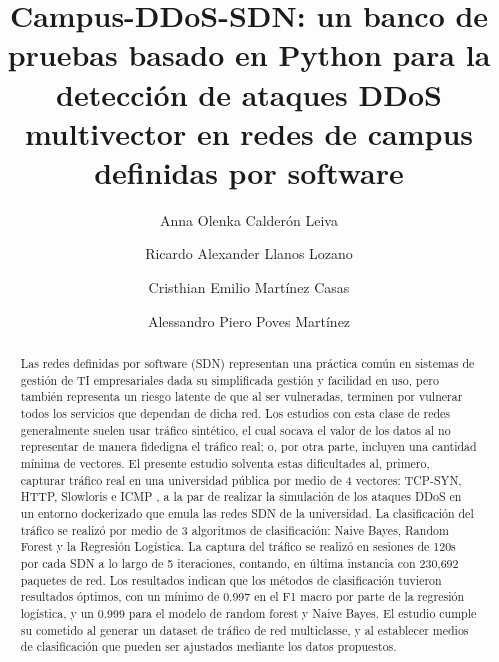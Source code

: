 \documentclass[a4paper,fleqn]{cas-dc}
\begin{document}
\let\WriteBookmarks\relax


\title[mode=title]{Campus-DDoS-SDN: un banco de pruebas basado en Python para la detección de ataques DDoS multivector en redes de campus definidas por software}

\author[1]{Anna Olenka Calderón Leiva}

\author[1]{Ricardo Alexander Llanos Lozano}

\author[1]{Cristhian Emilio Martínez Casas}
\cormark[1]

\author[1]{Alessandro Piero Poves Martínez}




\begin{abstract}
Las redes definidas por software (SDN) representan una práctica común en sistemas de gestión de TI empresariales dada su simplificada gestión y facilidad en uso, pero también representa un riesgo latente de que al ser vulneradas, terminen por vulnerar todos los servicios que dependan de dicha red. Los estudios con esta clase de redes generalmente suelen usar tráfico sintético, el cual socava el valor de los datos al no representar de manera fidedigna el tráfico real; o, por otra parte, incluyen una cantidad mínima de vectores. El presente estudio solventa estas dificultades al, primero, capturar tráfico real en una universidad pública por medio de 4 vectores: TCP-SYN, HTTP, Slowloris e ICMP , a la par de realizar la simulación de los ataques DDoS en un entorno dockerizado que emula las redes SDN de la universidad. La clasificación del tráfico se realizó por medio de 3 algoritmos de clasificación: Naive Bayes, Random Forest y la Regresión Logística. La captura del tráfico se realizó en sesiones de 120s por cada SDN a lo largo de 5 iteraciones, contando, en última instancia con 230,692 paquetes de red. Los resultados indican que los métodos de clasificación tuvieron resultados óptimos, con un mínimo de 0.997 en el F1 macro por parte de la regresión logística, y un 0.999 para el modelo de random forest y Naive Bayes. El estudio cumple su cometido al generar un dataset de tráfico de red multiclasse, y al establecer medios de clasificación que pueden ser ajustados mediante los datos propuestos. 

\end{abstract}
\end{document}

